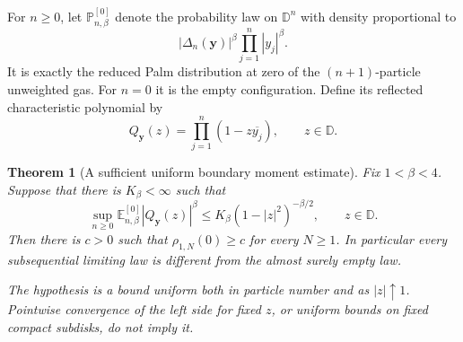 \documentclass[11pt,a4paper]{article}
\numberwithin{equation}{section}
\newtheorem{theorem}{Theorem}[section]
\theoremstyle{definition}
\theoremstyle{remark}
\newcommand{\D}{\mathbb D}
\begin{document}
For $n\ge0$, let $\mathbb P_{n,\beta}^{[0]}$ denote the probability
law on $\D^n$ with density proportional to
\[
 |\Delta_n(\mathbf y)|^\beta\prod_{j=1}^n|y_j|^\beta.
\]
It is exactly the reduced Palm distribution at zero of the
$(n+1)$-particle unweighted gas. For $n=0$ it is the empty
configuration. Define its reflected characteristic polynomial by
\[
 Q_{\mathbf y}(z)=\prod_{j=1}^n(1-z\overline{y_j}),
 \qquad z\in\D.
\]

\begin{theorem}[A sufficient uniform boundary moment estimate]
\label{thm:blaschke-boundary-moment-criterion}
Fix $1<\beta<4$. Suppose that there is $K_\beta<\infty$ such that
\begin{equation}
 \sup_{n\ge0}\mathbb E_{n,\beta}^{[0]}
       |Q_{\mathbf y}(z)|^\beta
 \le K_\beta(1-|z|^2)^{-\beta/2},\qquad z\in\D.
 \label{eq:blaschke-boundary-moment-hypothesis}
\end{equation}
Then there is $c>0$ such that $\rho_{1,N}(0)\ge c$ for every
$N\ge1$. In particular every subsequential limiting law is
different from the almost surely empty law.

The hypothesis is a bound uniform both in particle number and as
$|z|\uparrow1$. Pointwise convergence of the left side for fixed
$z$, or uniform bounds on fixed compact subdisks, do not imply it.
\end{theorem}
\end{document}
